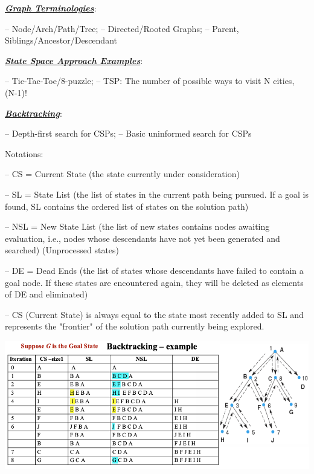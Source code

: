 \documentclass[12pt]{article}
\newcommand{\bulletPoint}[1]{\ul{\textit{\textbf{#1}}}}
\begin{document}
\begin{multicols*}{2}





\bulletPoint{Graph Terminologies}:

– Node/Arch/Path/Tree;  
– Directed/Rooted Graphs;  
– Parent, Siblings/Ancestor/Descendant

\bulletPoint{State Space Approach Examples}:

– Tic-Tac-Toe/8-puzzle;  
– TSP: The number of possible ways to visit N cities, (N-1)!



\bulletPoint{Backtracking}:

– Depth-first search for CSPs;  
– Basic uninformed search for CSPs

Notations:

– CS = Current State (the state currently under consideration)

– SL = State List (the list of states in the current path being pursued. If a
goal is found, SL contains the ordered list of states on the solution path)

– NSL = New State List (the list of new states contains nodes awaiting
evaluation, i.e., nodes whose descendants have not yet been generated
and searched) (Unprocessed states)

– DE = Dead Ends (the list of states whose descendants have failed to
contain a goal node. If these states are encountered again, they will be
deleted as elements of DE and eliminated)

– CS (Current State) is always equal to the state most recently added to SL
and represents the "frontier" of the solution path currently being explored.

\includegraphics[scale=0.31]{images/Backtracking.png}


\end{multicols*}
\end{document}

